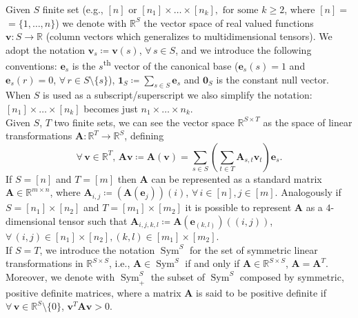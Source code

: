 \documentclass[a4paper, 11pt, reqno]{amsart}
\theoremstyle{plain}
\theoremstyle{remark}
\theoremstyle{definition}
\newcommand{\real}{\mathbb{R}}
\let\oldforall\forall
\renewcommand{\forall}{\oldforall\,}
\begin{document}
Given $S$ finite set (e.g., $[n] \text{ or } [n_1] \times \dots \times [n_k], \text{ for some } k \geq 2$, where $[n] =$ $= \{1, \dots, n\}$) we denote with $\real^S$ the vector space of real valued functions $\bm{v}: S \to \real$ (column vectors which generalizes to multidimensional tensors). 
We adopt the notation $\bm{v}_s \coloneqq \bm{v}(s)$, $\forall s \in S$, and we introduce the following conventions: $\bm{e}_s$ is the $s$\textsuperscript{th} vector of the canonical base ($\bm{e}_s(s) = 1$ and $\bm{e}_s(r) = 0$, $\forall r \in S \setminus \{s\}$), $\bm{1}_{S} \coloneqq \sum_{s \in S} \bm{e}_s$ and $\bm{0}_{S}$ is the constant null vector. 
When $S$ is used as a subscript/superscript we also simplify the notation: $[n_1] \times \dots \times [n_k]$ becomes just $n_1 \times \dots \times n_k$. \\
Given $S$, $T$ two finite sets, we can see the vector space $\real^{S \times T}$ as the space of linear transformations $\bm{A}: \real^T \to \real^S$, defining 
\begin{equation*}
	\forall \bm{v} \in \real^T, \, \bm{A} \bm{v} \coloneqq \bm{A}(\bm{v}) = \sum_{s \in S} \left(\sum_{t \in T} \bm{A}_{s, t} \bm{v}_t\right) \bm{e}_s.
\end{equation*}
If $S = [n]$ and $T = [m]$ then $\bm{A}$ can be represented as a standard matrix $\bm{A} \in \real^{m \times n}$, where $\bm{A}_{i, j} \coloneqq (\bm{A}(\bm{e}_j))(i)$, $\forall i \in [n], j \in [m]$. 
Analogously if $S = [n_1] \times [n_2]$ and $T = [m_1] \times [m_2]$ it is possible to represent $\bm{A}$ as a $4$-dimensional tensor such that $\bm{A}_{i, j, k, l} \coloneqq \bm{A}(\bm{e}_{(k, l)})((i, j))$, $\forall (i, j) \in [n_1] \times [n_2], (k, l) \in [m_1] \times [m_2]$. \\
If $S = T$, we introduce the notation $\operatorname{Sym}^{S}$ for the set of symmetric linear transformations in $\real^{S \times S}$, i.e., $\bm{A} \in \operatorname{Sym}^{S}$ if and only if $\bm{A} \in \real^{S \times S}$, $\bm{A} = \bm{A}^T$. 
Moreover, we denote with $\operatorname{Sym}_+^{S}$ the subset of $\operatorname{Sym}^{S}$ composed by symmetric, positive definite matrices, where a matrix $\bm{A}$ is said to be positive definite if $\forall \bm{v} \in \real^S \setminus \{0\}$, $\bm{v}^T \bm{A} \bm{v} > 0$.

\smallskip
\end{document}
